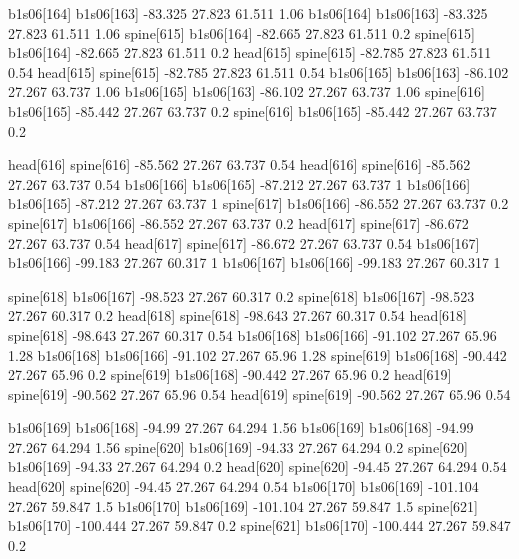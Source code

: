 b1s06[164]    b1s06[163]    -83.325    27.823    61.511    1.06
b1s06[164]    b1s06[163]    -83.325    27.823    61.511    1.06
spine[615]    b1s06[164]    -82.665    27.823    61.511    0.2
spine[615]    b1s06[164]    -82.665    27.823    61.511    0.2
head[615]    spine[615]    -82.785    27.823    61.511    0.54
head[615]    spine[615]    -82.785    27.823    61.511    0.54
b1s06[165]    b1s06[163]    -86.102    27.267    63.737    1.06
b1s06[165]    b1s06[163]    -86.102    27.267    63.737    1.06
spine[616]    b1s06[165]    -85.442    27.267    63.737    0.2
spine[616]    b1s06[165]    -85.442    27.267    63.737    0.2


head[616]    spine[616]    -85.562    27.267    63.737    0.54
head[616]    spine[616]    -85.562    27.267    63.737    0.54
b1s06[166]    b1s06[165]    -87.212    27.267    63.737    1
b1s06[166]    b1s06[165]    -87.212    27.267    63.737    1
spine[617]    b1s06[166]    -86.552    27.267    63.737    0.2
spine[617]    b1s06[166]    -86.552    27.267    63.737    0.2
head[617]    spine[617]    -86.672    27.267    63.737    0.54
head[617]    spine[617]    -86.672    27.267    63.737    0.54
b1s06[167]    b1s06[166]    -99.183    27.267    60.317    1
b1s06[167]    b1s06[166]    -99.183    27.267    60.317    1


spine[618]    b1s06[167]    -98.523    27.267    60.317    0.2
spine[618]    b1s06[167]    -98.523    27.267    60.317    0.2
head[618]    spine[618]    -98.643    27.267    60.317    0.54
head[618]    spine[618]    -98.643    27.267    60.317    0.54
b1s06[168]    b1s06[166]    -91.102    27.267    65.96    1.28
b1s06[168]    b1s06[166]    -91.102    27.267    65.96    1.28
spine[619]    b1s06[168]    -90.442    27.267    65.96    0.2
spine[619]    b1s06[168]    -90.442    27.267    65.96    0.2
head[619]    spine[619]    -90.562    27.267    65.96    0.54
head[619]    spine[619]    -90.562    27.267    65.96    0.54


b1s06[169]    b1s06[168]    -94.99    27.267    64.294    1.56
b1s06[169]    b1s06[168]    -94.99    27.267    64.294    1.56
spine[620]    b1s06[169]    -94.33    27.267    64.294    0.2
spine[620]    b1s06[169]    -94.33    27.267    64.294    0.2
head[620]    spine[620]    -94.45    27.267    64.294    0.54
head[620]    spine[620]    -94.45    27.267    64.294    0.54
b1s06[170]    b1s06[169]    -101.104    27.267    59.847    1.5
b1s06[170]    b1s06[169]    -101.104    27.267    59.847    1.5
spine[621]    b1s06[170]    -100.444    27.267    59.847    0.2
spine[621]    b1s06[170]    -100.444    27.267    59.847    0.2


